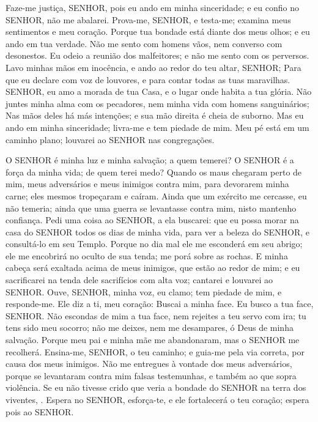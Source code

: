 {\PP 
  Faze-me justiça, SENHOR, pois eu ando em minha sinceridade; e eu confio no SENHOR, não me abalarei.
  Prova-me, SENHOR, e testa-me; examina meus sentimentos e meu coração.
  Porque tua bondade está diante dos meus olhos; e eu ando em tua verdade.
  Não me sento com homens vãos, nem converso com desonestos.
  Eu odeio a reunião dos malfeitores; e não me sento com os perversos.
  Lavo minhas mãos em inocência, e ando ao redor do teu altar, SENHOR;
  Para que eu declare com voz de louvores, e para contar todas as tuas maravilhas.
  SENHOR, eu amo a morada de tua Casa, e o lugar onde habita a tua glória.
  Não juntes minha alma com os pecadores, nem minha vida com homens sanguinários;
  Nas mãos deles há más intenções; e sua mão direita é cheia de suborno.
  Mas eu ando em minha sinceridade; livra-me e tem piedade de mim.
  Meu pé está em um caminho plano; louvarei ao SENHOR nas congregações.
\par }


{\PP 
  O SENHOR é minha luz e minha salvação; a quem temerei? O SENHOR é a força da minha vida; de quem terei medo?
  Quando os maus chegaram perto de mim, meus adversários e meus inimigos contra mim, para devorarem minha carne; eles mesmos tropeçaram e caíram.
  Ainda que um exército me cercasse, eu não temeria; ainda que uma guerra se levantasse contra mim, nisto mantenho confiança.
  Pedi uma coisa ao SENHOR,
{} a ela buscarei: que eu possa morar na casa do SENHOR todos os dias de minha vida, para ver a beleza do SENHOR, e consultá-lo em seu Templo.
  Porque no dia mal ele me esconderá em seu abrigo; ele me encobrirá no oculto de sua tenda;
{} me porá sobre as rochas.
  E minha cabeça será exaltada acima de meus inimigos, que estão ao redor de mim; e eu sacrificarei na tenda dele sacrifícios com alta voz; cantarei e louvarei ao SENHOR.
  Ouve, SENHOR, minha voz,
{} eu clamo; tem piedade de mim, e responde-me.
  Ele diz a ti, meu coração: Buscai a minha face. Eu busco a tua face, SENHOR.
  Não escondas de mim a tua face, nem rejeites a teu servo com ira; tu tens sido meu socorro; não me deixes, nem me desampares, ó Deus de minha salvação.
  Porque meu pai e minha mãe me abandonaram, mas o SENHOR me recolherá.
  Ensina-me, SENHOR, o teu caminho; e guia-me pela via correta, por causa dos meus inimigos.
  Não me entregues à vontade dos meus adversários, porque se levantaram contra mim falsas testemunhas, e também ao que sopra violência.
  Se eu não tivesse crido que veria a bondade do SENHOR na terra dos viventes,
{} .
  Espera no SENHOR, esforça-te, e ele fortalecerá o teu coração; espera pois ao SENHOR.
\par }

